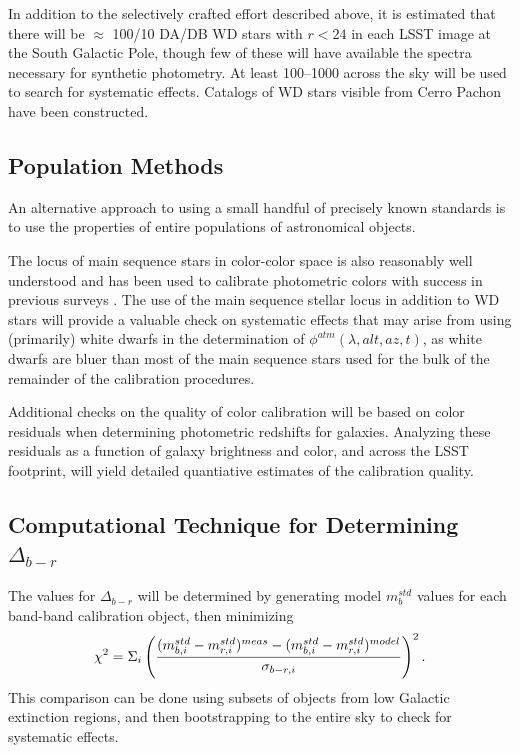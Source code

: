\documentclass[12pt,preprint]{aastex}
\begin{document}
In addition to the selectively crafted effort described above, it is estimated that
there will be $\approx$ 100/10 DA/DB WD stars with $r<24$ in each LSST
image at the South Galactic Pole, though few of these will have available
the spectra necessary for synthetic photometry. At least
100--1000 across the sky will be used to search for systematic effects.
Catalogs of WD stars visible from Cerro Pachon have been constructed.

\subsection{Population Methods}
An alternative approach to using a small handful of precisely known standards
is to use the properties of entire populations of astronomical objects.

The locus of main sequence stars in
color-color space is also reasonably well understood and has been used
to calibrate photometric colors with success in previous surveys
\citep{2004MNRAS.352.1255M, Ivezic2007, High09}.
The use of the main
sequence stellar locus in addition to WD stars will provide a valuable
check on systematic effects that may arise from using (primarily)
white dwarfs in the determination of $\phi^{atm}(\lambda,alt,az,t)$,
as white dwarfs are bluer than most of the main sequence stars used
for the bulk of the remainder of the calibration procedures.

Additional checks on the quality of color calibration will be based on
color residuals when determining photometric redshifts for
galaxies. Analyzing these residuals as a function of galaxy brightness
and color, and across the LSST footprint, will yield detailed
quantiative estimates of the calibration quality.  

\subsection{Computational Technique for Determining $\Delta_{b-r}$}
The values for $\Delta_{b-r}$ will be determined by generating model
$m_b^{std}$ values for each band-band calibration object, then
minimizing 
\begin{equation}
\chi^2 = \Sigma_{i} \left( { (m_{b,i}^{std} - m_{r,i}^{std})^{meas} - (m_{b,i}^{std}
    - m_{r,i}^{std})^{model} \over  \sigma_{b-r,i}}\right) ^2. 
\end{equation}
This comparison can
be done using subsets of objects from low Galactic extinction regions,
and then bootstrapping to the entire sky to check for systematic
effects. 
\end{document}
